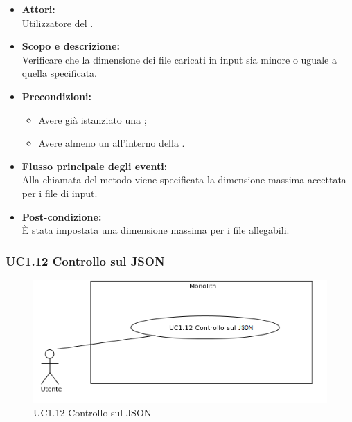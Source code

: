 \begin{itemize}
	\item \textbf{Attori:}
	\\Utilizzatore del .
	\item \textbf{Scopo e descrizione:} 
	\\Verificare che la dimensione dei file caricati in input sia minore o uguale a quella specificata.
	\item \textbf{Precondizioni:}
	\begin{itemize}
		\item Avere già istanziato una ;
		\item Avere almeno un  all'interno della .
	\end{itemize}
	\item \textbf{Flusso principale degli eventi:}
	\\Alla chiamata del metodo viene specificata la dimensione massima accettata per i file di input.
	\item \textbf{Post-condizione:}
	\\È stata impostata una dimensione massima per i file allegabili.
\end{itemize}

\subsubsection{UC1.12 Controllo sul JSON} \label{UC1.12}

\begin{figure}[H]
	\centering
	\includegraphics[width=15cm]{../../documenti/AnalisiDeiRequisiti/Diagrammi_img/uc1_12.png}
	\caption{UC1.12 Controllo sul JSON}
\end{figure}

